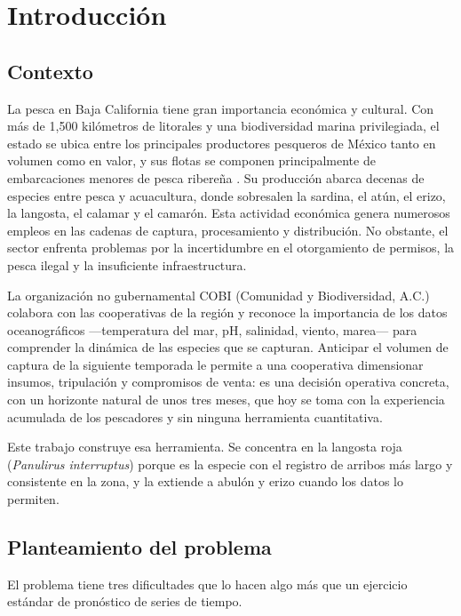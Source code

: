 \chapter{Introducción}
\label{cap:introduccion}

\section{Contexto}

La pesca en Baja California tiene gran importancia económica y cultural. Con más de 1{,}500
kilómetros de litorales y una biodiversidad marina privilegiada, el estado se ubica entre los
principales productores pesqueros de México tanto en volumen como en valor, y sus flotas se
componen principalmente de embarcaciones menores de pesca ribereña \citep{cnp2025}. Su
producción abarca decenas de especies entre pesca y acuacultura, donde sobresalen la sardina,
el atún, el erizo, la langosta, el calamar y el camarón. Esta actividad económica genera
numerosos empleos en las cadenas de captura, procesamiento y distribución. No obstante, el
sector enfrenta problemas por la incertidumbre en el otorgamiento de permisos, la pesca ilegal
y la insuficiente infraestructura.

La organización no gubernamental COBI (Comunidad y Biodiversidad, A.C.) colabora con las
cooperativas de la región y reconoce la importancia de los datos oceanográficos ---temperatura
del mar, pH, salinidad, viento, marea--- para comprender la dinámica de las especies que se
capturan. Anticipar el volumen de captura de la siguiente temporada le permite a una
cooperativa dimensionar insumos, tripulación y compromisos de venta: es una decisión operativa
concreta, con un horizonte natural de unos tres meses, que hoy se toma con la experiencia
acumulada de los pescadores y sin ninguna herramienta cuantitativa.

Este trabajo construye esa herramienta. Se concentra en la langosta roja
(\emph{Panulirus interruptus}) porque es la especie con el registro de arribos más largo y
consistente en la zona, y la extiende a abulón y erizo cuando los datos lo permiten.

\section{Planteamiento del problema}

El problema tiene tres dificultades que lo hacen algo más que un ejercicio estándar de
pronóstico de series de tiempo.

